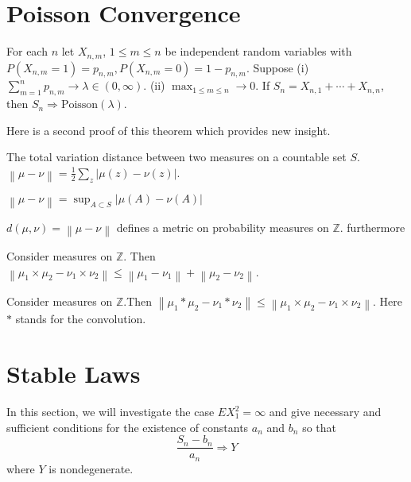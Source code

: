 \section{Poisson Convergence}
\begin{theorem}
    For each $n$ let $X_{n,m}$, $1\le m\le n$ be independent random variables with $P(X_{n,m}=1)=p_{n,m},P(X_{n,m}=0)=1-p_{n,m}$. Suppose \newline 
(i) $\sum_{m=1}^n p_{n,m} \to\lambda\in(0,\infty)$.\newline 
(ii) $\max_{1\le m\le n}\to 0$.\newline 
If $S_n=X_{n,1}+\cdots+X_{n,n}$, then $S_n\Longrightarrow \text{Poisson}(\lambda)$.
\end{theorem}

Here is a second proof of this theorem which provides new insight.
\begin{definition}
    The total variation distance between two measures on a countable set $S$. $\left\|\mu-\nu\right\|=\frac{1}{2}\sum_z\left|\mu(z)-\nu(z)\right|$.
\end{definition} 

\begin{lemma}
    $\left\|\mu-\nu\right\|=\sup_{A\subset S}\left|\mu(A)-\nu(A)\right|$
\end{lemma}

\begin{lemma}
    $d(\mu,\nu)=\left\|\mu-\nu\right\|$ defines a metric on probability measures on $\mathbb{Z}$. furthermore
\end{lemma}

\begin{lemma}
    Consider measures on $\mathbb{Z}$. Then $\left\|\mu_1\times\mu_2-\nu_1\times\nu_2\right\|\le\left\|\mu_1-\nu_1\right\|+\left\|\mu_2-\nu_2\right\|$.
\end{lemma}
\begin{lemma}
    Consider measures on $\mathbb{Z}$.Then $\left\|\mu_1*\mu_2-\nu_1*\nu_2\right\|\le \left\|\mu_1\times\mu_2-\nu_1\times\nu_2\right\|$.\newline
    Here $*$ stands for the convolution.
\end{lemma}

\section{Stable Laws}
In this section, we will investigate the case $EX_1^2=\infty$ and give necessary and sufficient conditions for the existence of constants $a_n$ and $b_n$ so that
\[\frac{S_n-b_n}{a_n}\Longrightarrow Y\] 
where $Y$ is nondegenerate.

